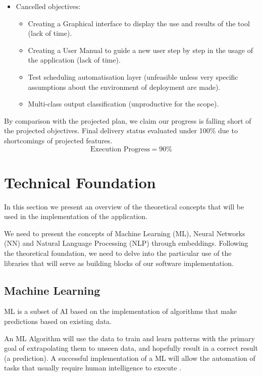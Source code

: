 \documentclass[a4paper, 11pt]{report}
\begin{document}
\begin{itemize}
\begin{itemize}
        \end{itemize}
        \item Cancelled objectives:
        \begin{itemize}
            \item Creating a Graphical interface to display the use and results of the tool (lack of time).
            \item Creating a User Manual to guide a new user step by step in the usage of the application (lack of time).
            \item Test scheduling automatisation layer (unfeasible unless very specific assumptions about the environment of deployment are made).
            \item Multi-class output classification (unproductive for the scope).
        \end{itemize}
    \end{itemize}

    By comparison with the projected plan, we claim our progress is falling short of the projected objectives. Final delivery status evaluated under 100\% due to shortcomings of projected features.
    $$
    \boxed{\text{Execution Progress} = 90\%}
    $$


\chapter{Technical Foundation}\label{Theory}
In this section we present an overview of the theoretical concepts that will be used in the implementation of the application.

We need to present the concepts of Machine Learning (ML), Neural Networks (NN) and Natural Language Processing (NLP) through embeddings. Following the theoretical foundation, we need to delve into the particular use of the libraries that will serve as building blocks of our software implementation.

\section{Machine Learning}
ML  is a subset of AI based on the implementation of algorithms that make predictions based on existing data.

An ML Algorithm will use the data to train and learn patterns with the primary goal of extrapolating them to unseen data, and hopefully result in a correct result (a prediction). A successful implementation of a ML will allow the automation of tasks that usually require human intelligence to execute
.
\end{document}
